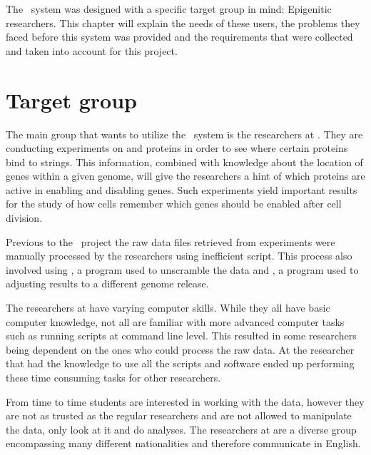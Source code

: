 
The \appName\ system was designed with a specific target group in mind: Epigenitic researchers. This chapter will explain the needs of these users, the problems they faced before this system was provided and the requirements that were collected and taken into account for this project.

\section{Target group}

The main group that wants to utilize the \appName\ system is the researchers at . They are conducting experiments on  and proteins in order to see where certain proteins bind to  strings. This information, combined with knowledge about the location of genes within a given genome, will give the researchers a hint of which proteins are active in enabling and disabling genes. Such experiments yield important results for the study of how cells remember which genes should be enabled after cell division.

Previous to the \appName\ project the raw data files retrieved from experiments were manually processed by the researchers using inefficient  script. This process also involved using \cite{langmead2009ultrafast}, a program used to unscramble the  data and \cite{LIFTOVER}, a program used to adjusting results to a different genome release.

The researchers at  have varying computer skills. While they all have basic computer knowledge, not all are familiar with more advanced computer tasks such as running scripts at command line level. This resulted in some researchers being dependent on the ones who could process the raw data. At  the researcher that had the knowledge to use all the scripts and software ended up performing these time consuming tasks for other researchers.

From time to time students are interested in working with the data, however they are not as trusted as the regular researchers and are not allowed to manipulate the data, only look at it and do analyses. The researchers at  are a diverse group encompassing many different nationalities and therefore communicate in English.

